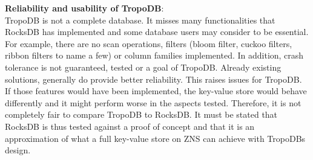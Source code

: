 \textbf{Reliability and usability of TropoDB}:\\
TropoDB is not a complete database. It misses many functionalities that RocksDB has implemented and some database users may consider to be essential. For example, there are no scan operations, filters (bloom filter, cuckoo filters, ribbon filters to name a few) or column families implemented. In addition, crash tolerance is not guaranteed, tested or a goal of TropoDB. Already existing solutions, generally do provide better reliability. This raises issues for TropoDB. If those features would have been implemented, the key-value store would behave differently and it might perform worse in the aspects tested. Therefore, it is not completely fair to compare TropoDB to RocksDB. It must be stated that RocksDB is thus tested against a proof of concept and that it is an approximation of what a full key-value store on ZNS can achieve with TropoDBs design.


